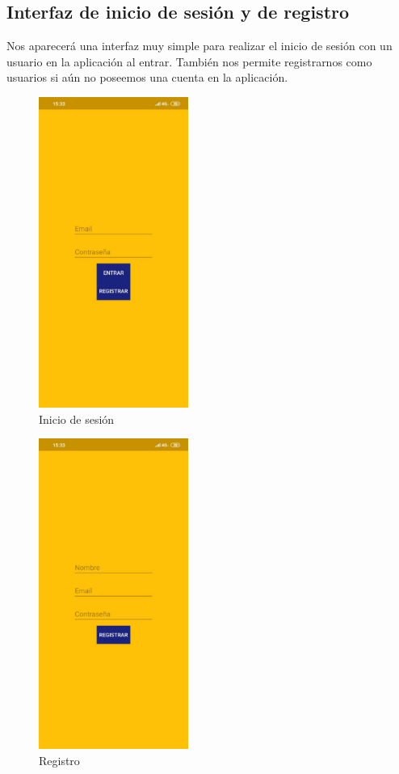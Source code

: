 \subsection{Interfaz de inicio de sesión y de registro}
\label{makereference3.4.6}

Nos aparecerá una interfaz muy simple para realizar el inicio de sesión con un usuario en la aplicación al entrar. También nos permite registrarnos como usuarios si
aún no poseemos una cuenta en la aplicación.

\begin{figure}[H]
    \centering
    \includegraphics[height=4in]{figures/login.jpg}
    \caption{Inicio de sesión}
\end{figure}
\begin{figure}[H]
    \centering
    \includegraphics[height=4in]{figures/register.jpg}
    \caption{Registro}
\end{figure}

